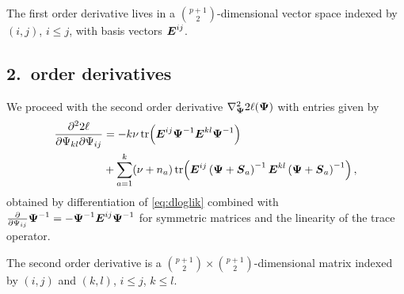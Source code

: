 \documentclass{article}\usepackage[]{graphicx}\usepackage[]{color}
\begin{document}
The first order derivative lives in a $\binom{p+1}{2}$-dimensional vector space indexed by $(i,j)$, $i\leq j$, with basis vectors ${\boldsymbol{E}}^{ij}$.

\subsection{2.\ order derivatives}
We proceed with the second order derivative $\nabla^2_{\boldsymbol{\Psi}} 2\ell({\boldsymbol{\Psi}})$
with entries given by
\begin{align*}
  \frac{\partial^2 2\ell}{\partial \Psi_{kl} \partial \Psi_{ij}}
  &= - k\nu\operatorname*{tr}\!\left( {\boldsymbol{E}}^{ij}{\boldsymbol{\Psi}}^{-1} {\boldsymbol{E}}^{kl}{\boldsymbol{\Psi}}^{-1} \right) \\
  & + \sum_{a = 1}^k (\nu + n_a)
    \operatorname*{tr}\!\left(
      {\boldsymbol{E}}^{ij}\left({\boldsymbol{\Psi}} + {\boldsymbol{S}}_a\right)^{-1}
      {\boldsymbol{E}}^{kl}\left({\boldsymbol{\Psi}} + {\boldsymbol{S}}_a\right)^{-1}
    \right),
\end{align*}
obtained by differentiation of \eqref{eq:dloglik} combined with
$\frac{\partial}{\partial \Psi_{ij}} {\boldsymbol{\Psi}}^{-1} = - {\boldsymbol{\Psi}}^{-1}{\boldsymbol{E}}^{ij}{\boldsymbol{\Psi}}^{-1}$
for symmetric matrices \citep[eq.\ (40)]{Petersen2008} and the linearity of the trace operator.

The second order derivative is a $\binom{p+1}{2} \times \binom{p+1}{2}$-dimensional matrix indexed by $(i,j)$ and $(k,l)$, $i \leq j$, $k \leq l$.
\end{document}
